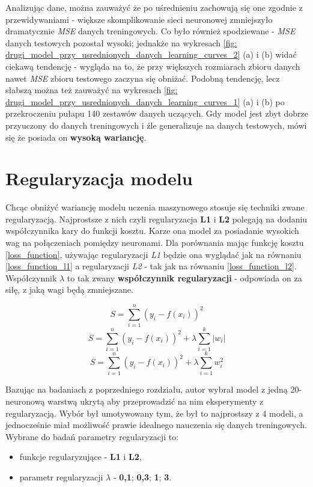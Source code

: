 \documentclass[12pt]{aghdpl}
\begin{document}
		Analizując dane, można zauważyć że po uśrednieniu zachowują się one zgodnie z przewidywaniami - większe skomplikowanie sieci neuronowej zmniejszyło dramatycznie \textit{MSE} danych treningowych. Co było również spodziewane - \textit{MSE} danych testowych pozostał wysoki; jednakże na wykresach \ref{fig: drugi_model_przy_usrednionych_danych_learning_curves_2} (a) i (b) widać ciekawą tendencję - wygląda na to, że przy większych rozmiarach zbioru danych nawet \textit{MSE} zbioru testowego zaczyna się obniżać. Podobną tendencję, lecz słabszą można też zauważyć na wykresach \ref{fig: drugi_model_przy_usrednionych_danych_learning_curves_1} (a) i (b) po przekroczeniu pułapu 140 zestawów danych uczących. Gdy model jest zbyt dobrze przyuczony do danych treningowych i źle generalizuje na danych testowych, mówi się że posiada on \textbf{wysoką wariancję}.
		
		\section{Regularyzacja modelu} \label{regularyzacja_modelu}
		Chcąc obniżyć wariancję modelu uczenia maszynowego stosuje się techniki zwane regularyzacją. Najprostsze z nich czyli regularyzacja \textbf{L1} i \textbf{L2} polegają na dodaniu współczynnika kary do funkcji kosztu. Karze ona model za posiadanie wysokich wag na połączeniach pomiędzy neuronami. Dla porównania mając funkcję kosztu \ref{loss_function}, używając regularyzacji \textit{L1} będzie ona wyglądać jak na równaniu \ref{loss_function_l1} a regularyzacji \textit{L2} - tak jak na równaniu \ref{loss_function_l2}. Współczynnik $\lambda$ to tak zwany \textbf{współczynnik regularyzacji} - odpowiada on za siłę, z jaką wagi będą zmniejszane.
		
		\begin{equation} \label{loss_function}
		S = \sum_{i = 1}^n (y_i - f(x_i))^2
		\end{equation}
		\begin{equation} \label{loss_function_l1}
		S = \sum_{i = 1}^n (y_i - f(x_i))^2 + \lambda \sum_{i = 1}^k |w_i|
		\end{equation}
		\begin{equation} \label{loss_function_l2}
		S = \sum_{i = 1}^n (y_i - f(x_i))^2 + \lambda \sum_{i = 1}^k w_i^2
		\end{equation}
		
		Bazując na badaniach z poprzedniego rozdziału, autor wybrał model z jedną 20-neuronową warstwą ukrytą aby przeprowadzić na nim eksperymenty z regularyzacją. Wybór był umotywowany tym, że był to najprostszy z 4 modeli, a jednocześnie miał możliwość prawie idealnego nauczenia się danych treningowych. Wybrane do badań parametry regularyzacji to:
		\begin{itemize}
		\item funkcje regularyzujące - \textbf{L1} i \textbf{L2},
		\item parametr regularyzacji $\lambda$ - \textbf{0,1}; \textbf{0,3}; \textbf{1}; \textbf{3}.
		\end{itemize}
		
\end{document}
